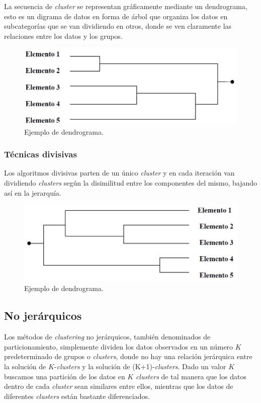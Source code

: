 \documentclass[a4paper, 20pt]{article}
\begin{document}
La secuencia de \textit{cluster} se representan gráficamente mediante un dendrograma, esto es un digrama de datos en forma de árbol que organiza los datos en subcategorías que se van dividiendo en otros, donde se ven claramente las relaciones entre los datos y los grupos.

\begin{figure}[H]
	\centering
	\includegraphics[scale=0.7]{victoria/aglomerativo}
	\caption{Ejemplo de dendrograma.}
	\label{fig:ejemplo}
\end{figure}

\subsubsection{Técnicas divisivas}
Los algoritmos divisivas parten de un único \textit{cluster} y en cada iteración van dividiendo \textit{clusters} según la disimilitud entre los componentes del mismo, bajando así en la jerarquía.

\begin{figure}[H]
	\centering
	\includegraphics[scale=0.7]{victoria/disociativo}
	\caption{Ejemplo de dendrograma.}
	\label{fig:ejemplo}
\end{figure}


\subsection{No jerárquicos}
Los métodos de \textit{clustering} no jerárquicos, también denominados de particionamiento, simplemente  dividen los datos observados en un número $K$ predeterminado de grupos o \textit{clusters}, donde no hay una relación jerárquica entre la solución de $K$-\textit{clusters} y la solución de (K+1)-\textit{clusters}. Dado un valor $K$ buscamos una partición de los datos en $K$ \textit{clusters} de tal manera que los datos dentro de cada \textit{cluster} sean similares entre ellos, mientras que los datos de diferentes \textit{clusters} están bastante diferenciados.
 
\end{document}
